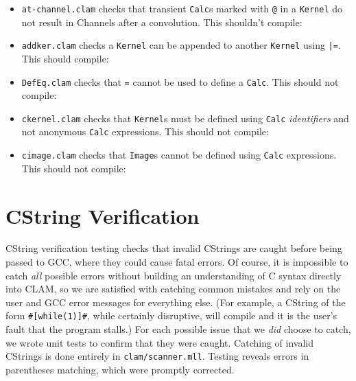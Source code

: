\begin{itemize}
\item\texttt{at-channel.clam} checks that transient \texttt{Calc}s marked with \texttt{@} in a \texttt{Kernel}
do not result in Channels after a convolution. This shouldn't compile:


\item\texttt{addker.clam} checks a \texttt{Kernel} can be appended to another \texttt{Kernel} using \texttt{|=}. This should compile:


\item\texttt{DefEq.clam} checks that \texttt{=} cannot be used to define a \texttt{Calc}. This should not compile:


\item\texttt{ckernel.clam} checks that \texttt{Kernel}s must be defined using \texttt{Calc} \emph{identifiers}
and not anonymous \texttt{Calc} expressions. This should not compile:


\item\texttt{cimage.clam} checks that \texttt{Image}s cannot be defined using \texttt{Calc} expressions. This should not compile:


\end{itemize}

\section{CString Verification}
\label{testing:cstrings}

CString verification testing checks that invalid CStrings are caught before being passed to GCC, where they
could cause fatal errors. Of course, it is impossible to catch \emph{all} possible errors without
building an understanding of C syntax directly into CLAM, so we are satisfied with catching common
mistakes and rely on the user and GCC error messages for everything else. (For example, a CString of the form \texttt{\#[while(1)]\#},
while certainly disruptive, will compile and it is the user's fault that the program stalls.)
For each possible issue that we \emph{did} choose to catch, we wrote unit tests to confirm that they were caught.
Catching of invalid CStrings is done entirely in \texttt{clam/scanner.mll}. Testing reveals errors
in parentheses matching, which were promptly corrected.\\


